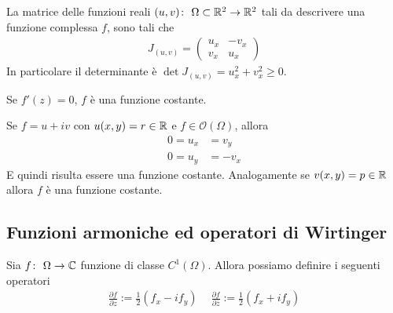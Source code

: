 \begin{corollary}
	La matrice delle funzioni reali $(u,v) \colon\ \Omega \subset \mathbb{R}^2 \rightarrow \mathbb{R}^2$ tali da descrivere una funzione complessa $f$, sono tali che  
	\begin{equation*}
	\begin{aligned}
		J_{(u,v)} = \left( \begin{array}{cc}
					u_x & - v_x\\ v_x & u_x
					\end{array} \right)
	\end{aligned}
	\end{equation*}
	In particolare il determinante è $\det J_{(u,v)} = u^2_x + v^2_x \ge 0$.
\end{corollary}

\begin{corollary}
	Se $f'(z) = 0$, $f$ è una funzione costante.
\end{corollary}

\begin{corollary}
	Se $f = u + iv$ con $u(x,y) = r \in \mathbb{R}$ e $f \in \mathcal{O}(\Omega)$, allora 
	\begin{equation*} 
	\begin{aligned}
		0 = u_x &= v_y \\
		0 = u_y &= -v_x
	\end{aligned}\end{equation*}
	E quindi risulta essere una funzione costante. Analogamente se $v(x,y) = p \in \mathbb{R}$ allora $f$ è una funzione costante.   
\end{corollary}

\subsection{\textcolor{AnComp}{\textbf{Funzioni armoniche ed operatori di Wirtinger}}}

\begin{definition}
	Sia $f \colon\ \Omega \rightarrow \mathbb{C}$ funzione di classe $C^1(\Omega)$. Allora possiamo definire i seguenti operatori
	\begin{equation*}
	\begin{aligned}
		\frac{\partial f}{\partial z} := \frac{1}{2}(f_x - if_y) \quad\ \frac{\partial f}{\partial \overline{z}} := \frac{1}{2}(f_x + if_y)
	\end{aligned}
	\end{equation*}
\end{definition}

